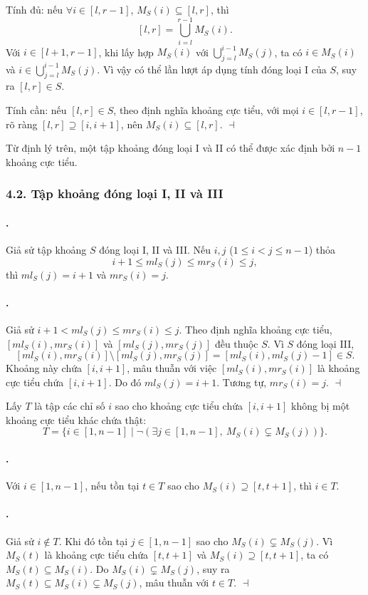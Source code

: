\documentclass[11pt]{article}
\providecommand{\square}{\dashv}
\begin{document}
Tính đủ: nếu $\forall i\in[l,r-1]$, $M_S(i)\subseteq[l,r]$, thì
\[
  [l,r]=\bigcup_{i=l}^{r-1} M_S(i).
\]
Với $i\in[l+1,r-1]$, khi lấy hợp $M_S(i)$ với
$\bigcup_{j=l}^{i-1}M_S(j)$, ta có $i\in M_S(i)$ và
$i\in\bigcup_{j=l}^{i-1}M_S(j)$. Vì vậy có thể lần lượt áp dụng tính đóng loại
I của $S$, suy ra $[l,r]\in S$.

Tính cần: nếu $[l,r]\in S$, theo định nghĩa khoảng cực tiểu, với mọi
$i\in[l,r-1]$, rõ ràng $[l,r]\supseteq[i,i+1]$, nên $M_S(i)\subseteq[l,r]$.
\hfill$\square$

Từ định lý trên, một tập khoảng đóng loại I và II có thể được xác định bởi
$n-1$ khoảng cực tiểu.

\subsubsection*{4.2. Tập khoảng đóng loại I, II và III}

\paragraph{.}
Giả sử tập khoảng $S$ đóng loại I, II và III. Nếu $i,j$ ($1\le i<j\le n-1$)
thỏa
\[
  i+1\le ml_S(j)\le mr_S(i)\le j,
\]
thì $ml_S(j)=i+1$ và $mr_S(i)=j$.

\paragraph{.}
Giả sử $i+1<ml_S(j)\le mr_S(i)\le j$. Theo định nghĩa khoảng cực tiểu,
$[ml_S(i),mr_S(i)]$ và $[ml_S(j),mr_S(j)]$ đều thuộc $S$. Vì $S$ đóng loại III,
\[
  [ml_S(i),mr_S(i)]\setminus[ml_S(j),mr_S(j)]
  =[ml_S(i),ml_S(j)-1]\in S.
\]
Khoảng này chứa $[i,i+1]$, mâu thuẫn với việc $[ml_S(i),mr_S(i)]$ là khoảng
cực tiểu chứa $[i,i+1]$. Do đó $ml_S(j)=i+1$. Tương tự, $mr_S(i)=j$.
\hfill$\square$

Lấy $T$ là tập các chỉ số $i$ sao cho khoảng cực tiểu chứa $[i,i+1]$ không bị
một khoảng cực tiểu khác chứa thật:
\[
  T=\{i\in[1,n-1]\mid
  \neg(\exists j\in[1,n-1],\ M_S(i)\subsetneq M_S(j))\}.
\]

\paragraph{.}
Với $i\in[1,n-1]$, nếu tồn tại $t\in T$ sao cho $M_S(i)\supseteq[t,t+1]$,
thì $i\in T$.

\paragraph{.}
Giả sử $i\notin T$. Khi đó tồn tại $j\in[1,n-1]$ sao cho
$M_S(i)\subsetneq M_S(j)$. Vì $M_S(t)$ là khoảng cực tiểu chứa $[t,t+1]$ và
$M_S(i)\supseteq[t,t+1]$, ta có $M_S(t)\subseteq M_S(i)$. Do
$M_S(i)\subsetneq M_S(j)$, suy ra $M_S(t)\subseteq M_S(i)\subsetneq M_S(j)$,
mâu thuẫn với $t\in T$. \hfill$\square$
\end{document}
